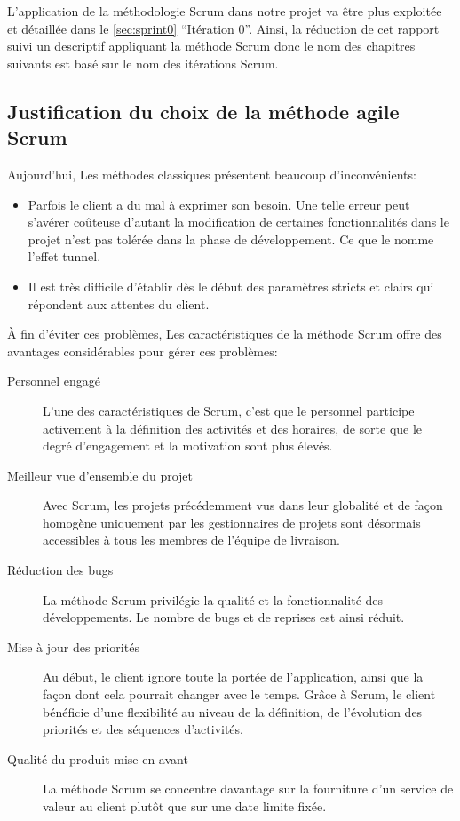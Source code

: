 L'application de la méthodologie Scrum dans notre projet 
va être plus exploitée et détaillée dans le \autoref{sec:sprint0} ``Itération
0''. Ainsi, la réduction de cet rapport suivi un descriptif appliquant la
méthode Scrum donc le nom des chapitres suivants est basé sur le nom des
itérations Scrum.

\subsection{Justification du choix de la méthode agile Scrum}

Aujourd'hui, Les méthodes classiques présentent beaucoup d'inconvénients:

\begin{itemize}
    \item Parfois le client a du mal à exprimer son besoin. Une telle erreur
        peut s'avérer coûteuse d'autant la modification de certaines
        fonctionnalités dans le projet n'est pas tolérée dans la phase de
        développement. Ce que le nomme l'effet tunnel.
    \item Il est très difficile d'établir dès le début des paramètres stricts
        et clairs qui répondent aux attentes du client.
\end{itemize}

À fin d'éviter ces problèmes, Les caractéristiques de la méthode Scrum offre
des avantages considérables pour gérer ces problèmes:

\begin{description}
    \item [Personnel engagé] L'une des caractéristiques de Scrum, c'est que le
        personnel participe activement à la définition des activités et des
        horaires, de sorte que le degré d'engagement et la motivation sont plus
        élevés.
    \item [Meilleur vue d'ensemble du projet] Avec Scrum, les projets
        précédemment vus dans leur globalité et de façon homogène uniquement
        par les gestionnaires de projets sont désormais accessibles à tous les
        membres de l'équipe de livraison.
    \item [Réduction des bugs] La méthode Scrum privilégie la qualité et la
        fonctionnalité des développements. Le nombre de bugs et de reprises est
        ainsi réduit.
    \item [Mise à jour des priorités] Au début, le client ignore toute la
        portée de l'application, ainsi que la façon dont cela pourrait changer
        avec le temps. Grâce à Scrum, le client bénéficie d'une flexibilité au
        niveau de la définition, de l'évolution des priorités et des séquences
        d'activités.
    \item [Qualité du produit mise en avant] La méthode Scrum se concentre
        davantage sur la fourniture d'un service de valeur au client plutôt que
        sur une date limite fixée.
\end{description}


